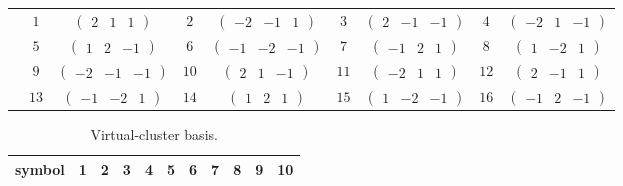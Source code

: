 \documentclass[fleqn,10pt,landscape]{article}
\begin{document}
\begin{itemize}
{\begin{center}
\begin{longtable}{ccccccccc}
 & $ 1 $ & $ \begin{pmatrix} 2 & 1 & 1 \end{pmatrix} $ & $ 2 $ & $ \begin{pmatrix} -2 & -1 & 1 \end{pmatrix} $ & $ 3 $ & $ \begin{pmatrix} 2 & -1 & -1 \end{pmatrix} $ & $ 4 $ & $ \begin{pmatrix} -2 & 1 & -1 \end{pmatrix} $ \\
& $ 5 $ & $ \begin{pmatrix} 1 & 2 & -1 \end{pmatrix} $ & $ 6 $ & $ \begin{pmatrix} -1 & -2 & -1 \end{pmatrix} $ & $ 7 $ & $ \begin{pmatrix} -1 & 2 & 1 \end{pmatrix} $ & $ 8 $ & $ \begin{pmatrix} 1 & -2 & 1 \end{pmatrix} $ \\
& $ 9 $ & $ \begin{pmatrix} -2 & -1 & -1 \end{pmatrix} $ & $ 10 $ & $ \begin{pmatrix} 2 & 1 & -1 \end{pmatrix} $ & $ 11 $ & $ \begin{pmatrix} -2 & 1 & 1 \end{pmatrix} $ & $ 12 $ & $ \begin{pmatrix} 2 & -1 & 1 \end{pmatrix} $ \\
& $ 13 $ & $ \begin{pmatrix} -1 & -2 & 1 \end{pmatrix} $ & $ 14 $ & $ \begin{pmatrix} 1 & 2 & 1 \end{pmatrix} $ & $ 15 $ & $ \begin{pmatrix} 1 & -2 & -1 \end{pmatrix} $ & $ 16 $ & $ \begin{pmatrix} -1 & 2 & -1 \end{pmatrix} $ \\
\end{longtable}
\end{center}
\begin{center}
\renewcommand{\arraystretch}{1.7}
\begin{longtable}{ccccccccccc}
\caption{Virtual-cluster basis.}
 \\
 \hline \hline
symbol & 1 & 2 & 3 & 4 & 5 & 6 & 7 & 8 & 9 & 10 \\ \hline \endfirsthead


\end{longtable}
\end{center}}
\end{itemize}
\end{document}

